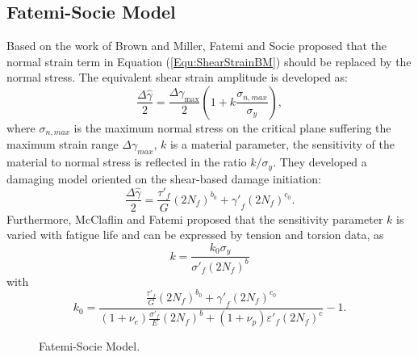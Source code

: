 \documentclass[preprint,5p,twocolumn,11pt,sort&compress]{elsarticle}
\begin{document}
\subsection{Fatemi-Socie Model}
Based on the work of Brown and Miller, Fatemi and Socie \cite{Fatemi1988} proposed that the normal strain term in Equation (\ref{Equ:ShearStrainBM}) should be replaced by the normal stress.
The equivalent shear strain amplitude is developed as:
\begin{equation}
\frac{{\Delta \hat \gamma }}{2} = \frac{{\Delta {\gamma _{\max }}}}{2}\left( {1 + k\frac{{{\sigma _{n,max}}}}{{{\sigma _y}}}} \right),
\end{equation}
where
$\sigma _{n,max}$ is the maximum normal stress on the critical plane suffering the maximum strain range $\Delta {\gamma _{max}}$, $k$ is a material parameter, the sensitivity of the material to normal stress is reflected in the ratio $k/\sigma_y$.
They developed a damaging model oriented on the shear-based damage initiation:
\begin{equation}
\frac{{\Delta \hat \gamma }}{2} = \frac{{{{\tau '}_f}}}{G}{\left( {2{N_f}} \right)^{{b_0}}} + {{\gamma '}_f}{\left( {2{N_f}} \right)^{{c_0}}}.
\end{equation}
Furthermore, McClaflin and Fatemi \cite{McClaflin2004} proposed that the sensitivity parameter $k$ is varied with fatigue life and can be expressed by tension and torsion data, as
\begin{equation}
k =  \frac{{k_0 {\sigma _y}}}{{{{\sigma '}_f}{{\left( {2{N_f}} \right)}^b}}}
\end{equation}
with
\[
k_0 =  {\frac{{\frac{{{{\tau '}_f}}}{G}{{\left( {2{N_f}} \right)}^{{b_0}}} + {{\gamma '}_f}{{\left( {2{N_f}} \right)}^{{c_0}}}}}{{\left( {1 + {\nu _e}} \right)\frac{{{{\sigma '}_f}}}{E}{{\left( {2{N_f}} \right)}^b} + \left( {1 + {\nu _p}} \right){{\varepsilon '}_f}{{\left( {2{N_f}} \right)}^c}}} - 1} .
\]

\begin{figure}[!htp]
\caption{Fatemi-Socie Model.}
\label{Fig:NF-NP-TMF-FS}
\end{figure}
\end{document}
